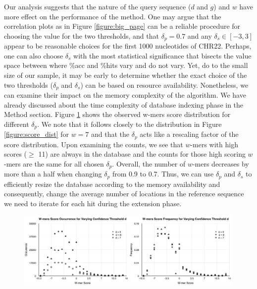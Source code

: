 \documentclass{article}
\begin{document}
Our analysis suggests that the nature of the query sequence ($d$ and $g$) and $w$ have more effect on the performance of the method. One may argue that the correlation plots as in Figure \ref{figure:big_page} can be a reliable procedure for choosing the value for the two thresholds, and that $\delta_p = 0.7$ and any $\delta_s \in [-3, 3]$ appear to be reasonable choices for the first 1000 nucleotides of CHR22. Perhaps, one can also choose $\delta_s$ with the most statistical significance that bisects the value space between where \%acc and \%hits vary and do not vary. Yet, do to the small size of our sample, it may be early to determine whether the exact choice of the two thresholds ($\delta_p$ and $\delta_s$) can be based on resource availability. Nonetheless, we can examine their impact on the memory complexity of the algorithm. We have already discussed about the time complexity of database indexing phase in the Method section. Figure \ref{figure:hit_freq} shows the observed w-mers score distribution for different $\delta_p$. We note that it follows closely to the distribution in Figure \ref{figure:score_dist} for $w=7$ and that the $\delta_p$ acts like a rescaling factor of the score distribution. Upon examining the counts, we see that $w$-mers with high scores ($\ge$ 11) are always in the database and the counts for those high scoring $w$-mers are the same for all chosen $\delta_p$. Overall, the number of $w$-mers decreases by more than a half when changing $\delta_p$ from 0.9 to 0.7. Thus, we can use $\delta_p$ and $\delta_s$ to efficiently resize the database according to the memory availability and consequently, change the average number of locations in the reference sequence we need to iterate for each hit during the extension phase. 

\begin{figure}[tbp]
\begin{center}
\caption{}
  \includegraphics[width=0.99\textwidth]{hit-score-freq-1000}
\label{figure:hit_freq}
\end{center}
\end{figure}
\end{document}
